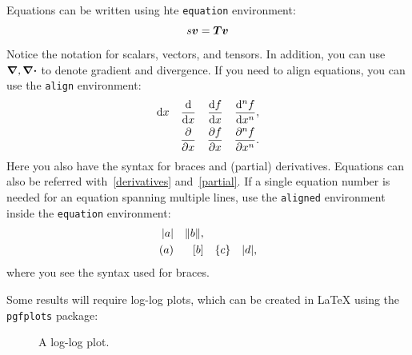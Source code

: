 \documentclass[twoside,twocolumn,10pt]{article}
\begin{document}
Equations can be written using hte \texttt{equation} environment:
\begin{equation}
\label{eq:de-fem}
 s \vb*{v} = \vb*{T} \vb*{v} 
\end{equation}
Notice the notation for scalars, vectors, and tensors. In addition, you can use $\grad, \div$ to denote gradient and divergence. 
If you need to align equations, you can use the \texttt{align} environment:
\begin{align}
  \dd{x} && \dv{x} && \dv{f}{x} && \dv[n]{f}{x}, \label{derivatives} \\
   && \pdv{x} &&  \pdv{f}{x} && \pdv[n]{f}{x}. \label{partial}
\end{align} 
Here you also have the syntax for braces and (partial) derivatives. Equations can also be referred with~\eqref{derivatives} and~\eqref{partial}. If a single equation number is needed for an equation spanning multiple lines, use the \texttt{aligned} environment inside the \texttt{equation} environment:
\begin{equation} \label{eq:alignment}
\begin{aligned}	
  \abs{a} && \norm{b},  \\
     \qty(a) && \qty[b] && \qty{c} && \qty|d|,
\end{aligned}
\end{equation}
where you see the syntax used for braces.


Some results will require log-log plots, which can be created in \LaTeX{} using the \texttt{pgfplots} package:
\begin{figure}
\centering
{}
\caption{A log-log plot.}
\end{figure}
\end{document}

